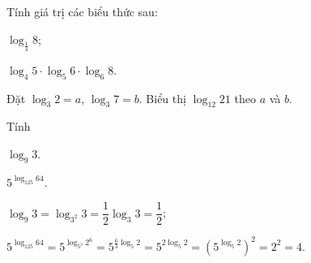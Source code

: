 \begin{bt}%
	Tính giá trị các biểu thức sau:
	\begin{listEX}[2]
		\item[a)] $ \log_{\frac{1}{4}} 8$;
		\item[b)] $ \log_4 5\cdot \log_5 6\cdot \log_6 8$.
	\end{listEX}
\end{bt}

\begin{bt}%
	Đặt $ \log_3 2=a $, $ \log_3 7=b $. Biểu thị $ \log_{12} 21 $ theo $ a $ và $ b $.
\end{bt}

\begin{bt}%
 
	Tính
	\begin{listEX}[2]
		\item  $\log _{9} 3$.
		\item $5^{\log _{125} 64}$.
	\end{listEX}
	\loigiai
	{\begin{listEX}[1]
			\item $ \log _{9} 3=\log _{3^{2}} 3=\dfrac{1}{2} \log _{3} 3=\dfrac{1}{2}$;
			\item $5^{\log _{125} 64}=5^{\log _{5^3} 2^6}=5^{\frac{6}{3}\log _{5} 2}=5^{2\log _{5} 2}=\left({5^{\log _{5} 2}}\right)^2=2^2=4$.
		\end{listEX}
	}
\end{bt}

